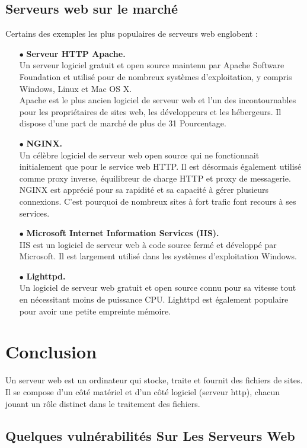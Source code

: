 \subsection{Serveurs web sur le marché}
Certains des exemples les plus populaires de serveurs web englobent :
\begin{enumerate}
	 \item [$\bullet$]\textbf{Serveur HTTP Apache.\\} Un serveur logiciel gratuit et open source maintenu par Apache Software Foundation et  utilisé pour de nombreux systèmes d’exploitation, y compris Windows, Linux et Mac OS X.\\
	 Apache est le plus ancien logiciel de serveur web et l’un des incontournables pour les propriétaires de sites web, les développeurs et les hébergeurs. Il dispose d’une part de marché de plus de 31 Pourcentage.
	 \item [$\bullet$]\textbf{NGINX.\\} Un célèbre logiciel de serveur web open source qui ne fonctionnait initialement que pour le service web HTTP. Il est désormais également utilisé comme proxy inverse, équilibreur de charge HTTP et proxy de messagerie. NGINX est apprécié pour sa rapidité et sa capacité à gérer plusieurs connexions. C’est pourquoi de nombreux sites à fort trafic font recours à ses services.
	 \item [$\bullet$]\textbf{Microsoft Internet Information Services (IIS).\\} IIS est un logiciel de serveur web à code source fermé et développé par Microsoft. Il est largement utilisé dans les systèmes d’exploitation Windows.
	 \item [$\bullet$]\textbf{Lighttpd.\\} Un logiciel de serveur web gratuit et open source connu pour sa vitesse tout en nécessitant moins de puissance CPU. Lighttpd est également populaire pour avoir une petite empreinte mémoire.
\end{enumerate}
\section*{Conclusion}
Un serveur web est un ordinateur qui stocke, traite et fournit des fichiers de sites. Il se compose d’un côté matériel et d’un côté logiciel (serveur http), chacun jouant un rôle distinct dans le traitement des fichiers.
\subsection{Quelques vulnérabilités Sur Les Serveurs Web }
 
